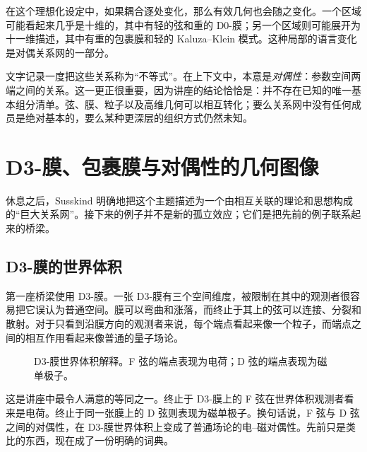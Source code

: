 在这个理想化设定中，如果耦合逐处变化，那么有效几何也会随之变化。一个区域可能看起来几乎是十维的，其中有轻的弦和重的 D0-膜；另一个区域则可能展开为十一维描述，其中有重的包裹膜和轻的 Kaluza--Klein 模式。这种局部的语言变化是对偶关系网的一部分。

文字记录一度把这些关系称为``不等式''。在上下文中，本意是\emph{对偶性}：参数空间两端之间的关系。这一更正很重要，因为讲座的结论恰恰是：并不存在已知的唯一基本组分清单。弦、膜、粒子以及高维几何可以相互转化；要么关系网中没有任何成员是绝对基本的，要么某种更深层的组织方式仍然未知。

\section{D3-膜、包裹膜与对偶性的几何图像}

休息之后，Susskind 明确地把这个主题描述为一个由相互关联的理论和思想构成的``巨大关系网''。接下来的例子并不是新的孤立效应；它们是把先前的例子联系起来的桥梁。

\subsection{D3-膜的世界体积}

第一座桥梁使用 D3-膜。一张 D3-膜有三个空间维度，被限制在其中的观测者很容易把它误认为普通空间。膜可以弯曲和涨落，而终止于其上的弦可以连接、分裂和散射。对于只看到沿膜方向的观测者来说，每个端点看起来像一个粒子，而端点之间的相互作用看起来像普通的量子场论。

\begin{figure}[htbp]
\centering
{}%
\caption{D3-膜世界体积解释。F 弦的端点表现为电荷；D 弦的端点表现为磁单极子。}
\end{figure}

这是讲座中最令人满意的等同之一。终止于 D3-膜上的 F 弦在世界体积观测者看来是电荷。终止于同一张膜上的 D 弦则表现为磁单极子。换句话说，F 弦与 D 弦之间的对偶性，在 D3-膜世界体积上变成了普通场论的电--磁对偶性。先前只是类比的东西，现在成了一份明确的词典。

